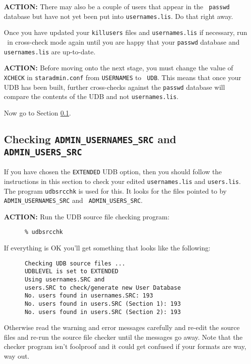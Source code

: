 {\large\bf ACTION:} There may also be a couple of users that appear in the {\tt
passwd} database but have not yet been put into {\tt usernames.lis}. Do that
right away.

Once you have updated your {\tt killusers} files and {\tt usernames.lis} if
necessary, run \staradmin\ in cross-check mode again until you are happy that
your {\tt passwd} database and {\tt usernames.lis} are up-to-date.

{\large\bf ACTION:} Before moving onto the next stage, you must change the
value of {\tt XCHECK}  in {\tt staradmin.conf} from {\tt USERNAMES} to {\tt
UDB}. This means that once your UDB has been built, further cross-checks
against the {\tt passwd} database will compare the contents of the UDB and not
{\tt usernames.lis}.

Now go to Section \ref{checkusers}.

\subsection{Checking {\tt ADMIN\_USERNAMES\_SRC} and {\tt ADMIN\_USERS\_SRC}}
\label{checkusers}

If you have chosen the {\tt EXTENDED} UDB option, then you should follow the
instructions in this section to check your edited {\tt usernames.lis} and
{\tt users.lis}. The program {\tt udbsrcchk} is used for this. It looks for
the files pointed to by {\tt ADMIN\_USERNAMES\_SRC} and {\tt
ADMIN\_USERS\_SRC}.

{\large\bf ACTION:} Run the UDB source file checking program:

\begin{verbatim}
      % udbsrcchk
\end{verbatim}

If everything is OK you'll get something that looks like the following:

\begin{verbatim}
      Checking UDB source files ...
      UDBLEVEL is set to EXTENDED
      Using usernames.SRC and
      users.SRC to check/generate new User Database
      No. users found in usernames.SRC: 193
      No. users found in users.SRC (Section 1): 193
      No. users found in users.SRC (Section 2): 193
\end{verbatim}

Otherwise read the warning and error messages carefully and re-edit the source
files and re-run the source file checker until the messages go away. Note that
the checker program isn't foolproof and it could get confused if your formats
are way, way out.

